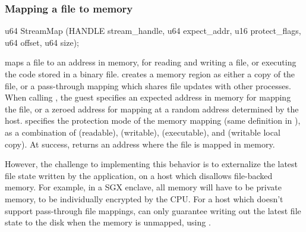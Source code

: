 


\subsubsection*{Mapping a file to memory}
                   
\begin{paldef}            
u64 StreamMap (HANDLE stream_handle, u64 expect_addr,
               u16 protect_flags, u64 offset, u64 size);
\end{paldef}


 maps a file to an address in memory, for reading and writing a file, or executing the code stored in a binary file.
 creates a memory region
as either a copy of the file,
or a pass-through mapping which shares file updates with other processes.
When calling ,
the guest specifies an expected address in memory for mapping the file, or a zeroed address for mapping at a random address determined by the host.
 specifies the protection mode
of the memory mapping (same definition in ), as a combination of  (readable),  (writable),  (executable), and  (writable local copy).
At success, 
returns an address where the file is mapped in memory.






However, the challenge to implementing this behavior
is to externalize the latest file state
written by the application,
on a host which disallows file-backed memory.
For example, in a SGX enclave, all memory will have to be private memory,
to be individually encrypted by the CPU.
For a host which doesn't support pass-through file mappings,
can only guarantee writing out
the latest file state to the disk when the memory is unmapped, using .











